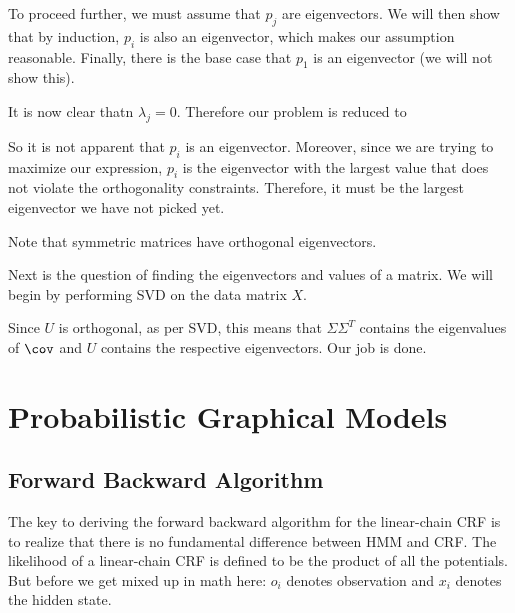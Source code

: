 \documentclass[12pt]{article}
\begin{document}
To proceed further, we must assume that $p_j$ are eigenvectors. We will then show that by induction, $p_i$ is also an eigenvector, which makes our assumption reasonable. Finally, there is the base case that $p_1$ is an eigenvector (we will not show this).


It is now clear thatn $\lambda_j = 0$. Therefore our problem is reduced to


So it is not apparent that $p_i$ is an eigenvector. Moreover, since we are trying to maximize our expression, $p_i$ is the eigenvector with the largest value that does not violate the orthogonality constraints. Therefore, it must be the largest eigenvector we have not picked yet.

Note that symmetric matrices have orthogonal eigenvectors. 

Next is the question of finding the eigenvectors and values of a matrix. We will begin by performing SVD on the data matrix $X$.


Since $U$ is orthogonal, as per SVD, this means that $\Sigma \Sigma^T$ contains the eigenvalues of $\cov$ and $U$ contains the respective eigenvectors. Our job is done.

\section{Probabilistic Graphical Models}
\subsection{Forward Backward Algorithm}

The key to deriving the forward backward algorithm for the linear-chain CRF is to realize that there is no fundamental difference between HMM and CRF.
The likelihood of a linear-chain CRF is defined to be the product of all the potentials. But before we get mixed up in math here: $o_i$ denotes observation and $x_i$ denotes the hidden state.
\end{document}
